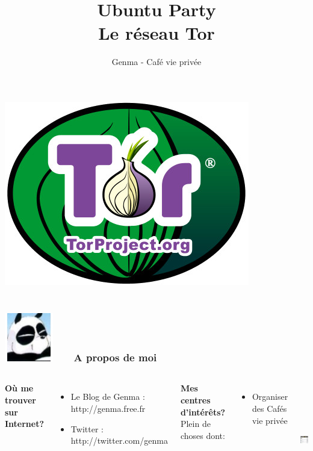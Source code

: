 \documentclass{beamer}
\title[Tor et le Tor Browser Bundle]{Ubuntu Party \\ Le réseau Tor}
\author{Genma - Café vie privée}
\begin{document}
\begin{frame}
	\titlepage
	\vfill
	\begin{center}
		\includegraphics[scale=0.2]{./images/logo_tor.jpg}
		\\		
		\\[2.5ex]
		{\tiny\CcNote{\CcLongnameByNcSa}}
		\vspace*{-2.5ex}
	\end{center}
\end{frame}

\begin{frame}
\frametitle{\includegraphics[scale=0.4]{./images/Genma.jpg} \ \ \  A propos de moi  }
\begin{columns}[c] 

\textbf{Où me trouver sur Internet?}
\begin{itemize}
\item Le Blog de Genma : http://genma.free.fr
\item Twitter : http://twitter.com/genma
\end{itemize}
\textbf{Mes centres d'intérêts?}
\\ Plein de choses dont:
\begin{itemize}
\item Organiser des Cafés vie privée
\end{itemize}
\includegraphics[width=5cm,height=5cm]{./images/blog.png} 
\end{columns}
\end{frame}
\end{document}
